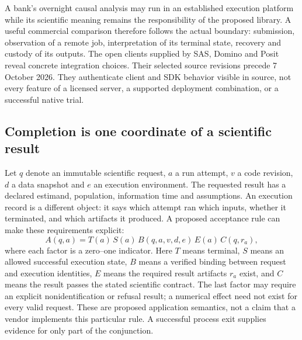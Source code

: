 A bank's overnight causal analysis may run in an established execution
platform while its scientific meaning remains the responsibility of the
proposed library. A useful commercial comparison therefore follows the
actual boundary: submission, observation of a remote job, interpretation of
its terminal state, recovery and custody of its outputs. The open clients
supplied by SAS, Domino and Posit reveal concrete integration choices. Their
selected source revisions precede 7 October 2026. They authenticate client
and SDK behavior visible in source, not every feature of a licensed server,
a supported deployment combination, or a successful native trial.
\citep{exec23_workflow_sasctl,exec23_workflow_dominopy,
exec23_workflow_connectapi,exec23_workflow_positgo}

\subsection{Completion is one coordinate of a scientific result}
\label{exec23:clients-completion}

Let $q$ denote an immutable scientific request, $a$ a run attempt, $v$ a code
revision, $d$ a data snapshot and $e$ an execution environment. The requested
result has a declared estimand, population, information time and assumptions.
An execution record is a different object: it says which attempt ran which
inputs, whether it terminated, and which artifacts it produced. A proposed
acceptance rule can make these requirements explicit:
\begin{equation}
 A(q,a)=T(a)\,S(a)\,B(q,a,v,d,e)\,E(a)\,C(q,r_a),
 \label{exec23:clients-acceptance}
\end{equation}
where each factor is a zero--one indicator. Here $T$ means terminal, $S$
means an allowed successful execution state, $B$ means a verified binding
between request and execution identities, $E$ means the required result
artifacts $r_a$ exist, and $C$ means the result passes the stated scientific
contract. The last factor may require an explicit nonidentification or
refusal result; a numerical effect need not exist for every valid request.
These are proposed application semantics, not a claim that a vendor implements
this particular rule. A successful process exit supplies evidence for only
part of the conjunction.

